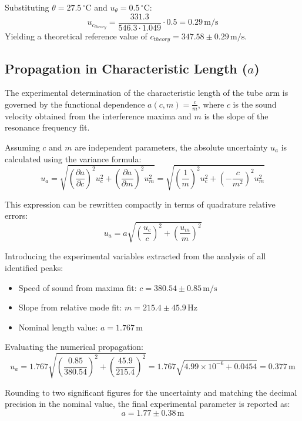\documentclass[a4paper,11pt]{article}
\begin{document}
Substituting $\theta = 27.5\,^{\circ}\mathrm{C}$ and $u_\theta = 0.5\,^{\circ}\mathrm{C}$:
\begin{equation}
    u_{c_{theory}} = \frac{331.3}{546.3 \cdot 1.049} \cdot 0.5 = 0.29\,\mathrm{m/s}
\end{equation}
Yielding a theoretical reference value of $c_{theory} = 347.58 \pm 0.29\,\mathrm{m/s}$.

\subsection{Propagation in Characteristic Length ($a$)}
The experimental determination of the characteristic length of the tube arm is governed by the functional dependence $a(c, m) = \frac{c}{m}$, where $c$ is the sound velocity obtained from the interference maxima and $m$ is the slope of the resonance frequency fit. 

Assuming $c$ and $m$ are independent parameters, the absolute uncertainty $u_a$ is calculated using the variance formula:
\begin{equation}
    u_a = \sqrt{\left( \frac{\partial a}{\partial c} \right)^2 u_c^2 + \left( \frac{\partial a}{\partial m} \right)^2 u_m^2} = \sqrt{\left( \frac{1}{m} \right)^2 u_c^2 + \left( - \frac{c}{m^2} \right)^2 u_m^2}
\end{equation}

This expression can be rewritten compactly in terms of quadrature relative errors:
\begin{equation}
    u_a = a \sqrt{\left( \frac{u_c}{c} \right)^2 + \left( \frac{u_m}{m} \right)^2}
\end{equation}

Introducing the experimental variables extracted from the analysis of all identified peaks:
\begin{itemize}
    \item Speed of sound from maxima fit: $c = 380.54 \pm 0.85\,\mathrm{m/s}$
    \item Slope from relative mode fit: $m = 215.4 \pm 45.9\,\mathrm{Hz}$
    \item Nominal length value: $a = 1.767\,\mathrm{m}$
\end{itemize}

Evaluating the numerical propagation:
\begin{equation}
    u_a = 1.767 \sqrt{\left( \frac{0.85}{380.54} \right)^2 + \left( \frac{45.9}{215.4} \right)^2} = 1.767 \sqrt{4.99\times 10^{-6} + 0.0454} = 0.377\,\mathrm{m}
\end{equation}

Rounding to two significant figures for the uncertainty and matching the decimal precision in the nominal value, the final experimental parameter is reported as:
\begin{equation}
    a = 1.77 \pm 0.38\,\mathrm{m}
\end{equation}
\end{document}
